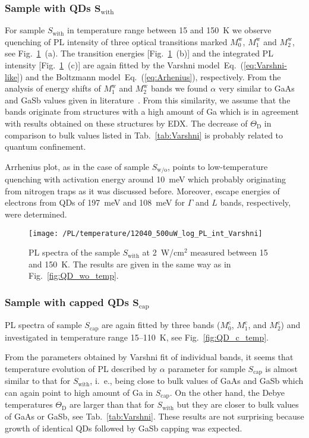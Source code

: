 \subsubsection*{Sample with QDs $\mathbf{S_\mathrm{with}}$}
%
For sample $S_\mathrm{with}$ in temperature range between 15 and 150~K we observe quenching of PL intensity of three optical transitions marked $M_0^\mathrm{w}$, $M_1^\mathrm{w}$ and $M_2^\mathrm{w}$, see Fig.~\ref{fig:QD_w_temp}~(a). The transition energies [Fig.~\ref{fig:QD_w_temp}~(b)] and the integrated PL intensity [Fig.~\ref{fig:QD_w_temp}~(c)] are again fitted by the Varshni model~Eq.~(\ref{eq:Varshni-like}) and the Boltzmann model~Eq.~(\ref{eq:Arhenius}), respectively. %
%
From the analysis of energy shifts of $M_1^\mathrm{w}$ and $M_2^\mathrm{w}$ bands we found $\alpha$ very similar to GaAs and GaSb values given in literature~\cite{Vurgaftman}. From this similarity, we assume that the bands originate from structures with a high amount of Ga which is in agreement with results obtained on these structures by EDX. The decrease of $\Theta_\mathrm{D}$ in comparison to bulk values listed in Tab.~\ref{tab:Varshni} is probably related to quantum confinement.

Arrhenius plot, as in the case of sample $S_\mathrm{w/o}$, points to low-temperature quenching with activation energy around 10~meV which probably originating from nitrogen traps as it was discussed before. Moreover, escape energies of electrons from QDs of 197~meV and 108~meV for $\Gamma$ and $L$ bands, respectively, were determined. 
%
\begin{figure}
	\centering
	\texttt{[image: /PL/temperature/12040\_500uW\_log\_PL\_int\_Varshni]}
	\caption{PL spectra of the sample ${S_\mathrm{with}}$ at 2~W/cm$^2$ measured between 15 and 150~K. The results are given in the same way as in Fig.~\ref{fig:QD_wo_temp}.}
	\label{fig:QD_w_temp}
\end{figure}

\subsubsection*{Sample with capped QDs $\mathbf{S_\mathrm{cap}}$}
%
PL spectra of sample ${S_\mathrm{cap}}$ are again fitted by three bands ($M_0^\mathrm{c}$, $M_1^\mathrm{c}$, and $M_2^\mathrm{c}$) and investigated in temperature range 15--110~K, see Fig.~\ref{fig:QD_c_temp}.

From the parameters obtained by Varshni fit of individual bands, it seems that temperature evolution of PL described by $\alpha$ parameter for sample ${S_\mathrm{cap}}$ is almost similar to that for ${S_\mathrm{with}}$, i.~e., being close to bulk values of GaAs and GaSb which can again point to high amount of Ga in ${S_\mathrm{cap}}$. On the other hand, the Debye temperatures $\Theta_\mathrm{D}$ are larger than that for ${S_\mathrm{with}}$ but they are closer to bulk values of GaAs or GaSb, see Tab.~\ref{tab:Varshni}. These results are not surprising because growth of identical QDs followed by GaSb capping was expected.

